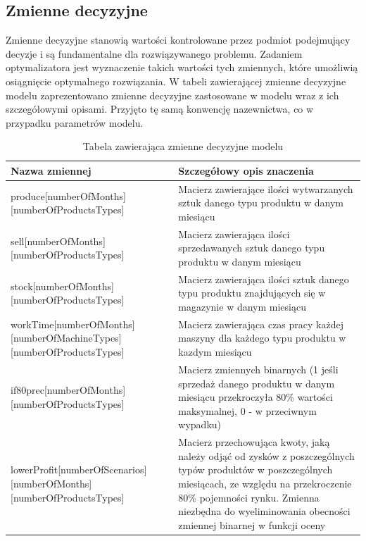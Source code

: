 \documentclass[11pt,a4paper]{article}
\begin{document}
\subsection{Zmienne decyzyjne}
Zmienne decyzyjne stanowią wartości kontrolowane przez podmiot podejmujący decyzje i są fundamentalne dla rozwiązywanego problemu. Zadaniem optymalizatora jest wyznaczenie takich wartości tych zmiennych, które umożliwią osiągnięcie optymalnego rozwiązania. W tabeli zawierającej zmienne decyzyjne modelu zaprezentowano zmienne decyzyjne zastosowane w modelu wraz z ich szczegółowymi opisami. Przyjęto tę samą konwencję nazewnictwa, co w przypadku parametrów modelu.

\begin{table}[ht!]
\caption{Tabela zawierająca zmienne decyzyjne modelu}
\label{tab:var}
\begin{tabular}{lp{7.5cm}}
	\hline
    Nazwa zmiennej      & Szczegółowy opis znaczenia \\
        \hline
        produce[numberOfMonths][numberOfProductsTypes] & Macierz zawierające ilości wytwarzanych sztuk danego typu produktu w danym miesiącu \\
        sell[numberOfMonths][numberOfProductsTypes] & Macierz zawierająca ilości sprzedawanych sztuk danego typu produktu w danym miesiącu \\
        stock[numberOfMonths][numberOfProductsTypes] & Macierz zawierająca ilości sztuk danego typu produktu znajdujących się w magazynie w danym miesiącu \\
        workTime[numberOfMonths][numberOfMachineTypes][numberOfProductsTypes] & Macierz zawierająca czas pracy każdej maszyny dla każdego typu produktu w kazdym miesiącu \\
        if80prec[numberOfMonths][numberOfProductsTypes] & Macierz zmiennych binarnych (1 jeśli sprzedaż danego produktu w danym miesiącu przekroczyła 80\% wartości maksymalnej, 0 - w przeciwnym wypadku)\\
        lowerProfit[numberOfScenarios][numberOfMonths][numberOfProductsTypes] & Macierz przechowująca kwoty, jaką należy odjąć od zysków z poszczególnych typów produktów w poszczególnych miesiącach, ze względu na przekroczenie 80\% pojemności rynku. Zmienna niezbędna do wyeliminowania obecności zmiennej binarnej w funkcji oceny\\
	\hline
\end{tabular}
\end{table}
\end{document}

